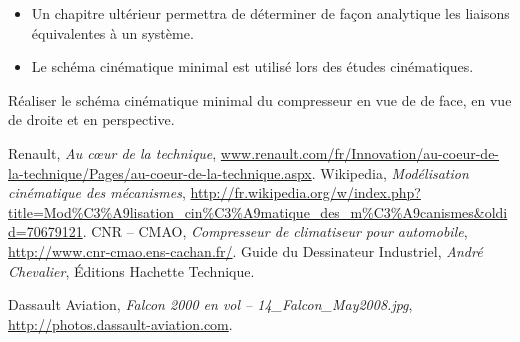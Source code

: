 \documentclass[10pt,oneside]{article}
\begin{document}
\begin{rem}
\begin{itemize}
\item Un chapitre ultérieur permettra de déterminer de façon analytique les liaisons équivalentes à un système. 
\item Le schéma cinématique minimal est utilisé lors des études cinématiques.
\end{itemize}
\end{rem}


\begin{exemple}
Réaliser le schéma cinématique minimal du compresseur en vue de de face, en vue de droite et en perspective.
\end{exemple}

\begin{thebibliography}{2}
    Renault, \textit{Au c\oe{}ur de la technique}, \url{www.renault.com/fr/Innovation/au-coeur-de-la-technique/Pages/au-coeur-de-la-technique.aspx}.
    Wikipedia, \textit{Modélisation cinématique des mécanismes}, \url{http://fr.wikipedia.org/w/index.php?title=Mod\%C3\%A9lisation_cin\%C3\%A9matique_des_m\%C3\%A9canismes\&oldid=70679121}.
    CNR -- CMAO, \textit{Compresseur de climatiseur pour automobile}, \url{http://www.cnr-cmao.ens-cachan.fr/}.
    Guide du Dessinateur Industriel, \textit{André Chevalier}, \'Editions Hachette Technique.
  
    Dassault Aviation, \textit{Falcon 2000 en vol -- 14\_Falcon\_May2008.jpg}, \url{http://photos.dassault-aviation.com}.
\end{thebibliography}
\end{document}
